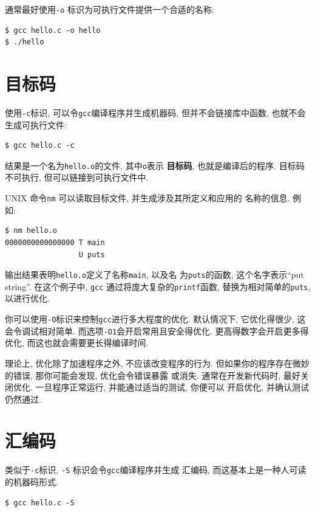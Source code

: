 \documentclass[12pt]{book}
\begin{document}
{通常最好使用{\tt -o} 标识为可执行文件提供一个合适的名称:

\begin{verbatim}
$ gcc hello.c -o hello
$ ./hello
\end{verbatim}


\section{目标码}

使用{\tt -c}标识, 可以令{\tt gcc}编译程序并生成机器码, 但并不会链接库中函数, 也就不会生成可执行文件:

\begin{verbatim}
$ gcc hello.c -c
\end{verbatim}

结果是一个名为{\tt hello.o}的文件, 其中{\tt o}表示
{\bf 目标码}, 也就是编译后的程序. 
目标码不可执行, 但可以链接到可执行文件中.

UNIX 命令{\tt nm} 可以读取目标文件, 并生成涉及其所定义和应用的
名称的信息. 例如:

\begin{verbatim}
$ nm hello.o
0000000000000000 T main
                 U puts
\end{verbatim}

输出结果表明{\tt hello.o}定义了名称{\tt main}, 以及名
为{\tt puts}的函数, 这个名字表示``put string''.
在这个例子中, {\tt gcc} 通过将庞大复杂的{\tt printf}函数,
替换为相对简单的{\tt puts}, 以进行优化.

你可以使用{\tt -O}标识来控制{\tt gcc}进行多大程度的优化.
默认情况下, 它优化得很少, 这会令调试相对简单.
而选项{\tt -O1}会开启常用且安全得优化.
更高得数字会开启更多得优化, 而这也就会需要更长得编译时间.

理论上, 优化除了加速程序之外, 不应该改变程序的行为. 
但如果你的程序存在微妙的错误, 那你可能会发现, 优化会令错误暴露
或消失. 通常在开发新代码时, 最好关闭优化.
一旦程序正常运行, 并能通过适当的测试, 你便可以
开启优化, 并确认测试仍然通过.


\section{汇编码}

类似于{\tt -c}标识, {\tt -S} 标识会令{\tt gcc}编译程序并生成
汇编码, 而这基本上是一种人可读的机器码形式.

\begin{verbatim}
$ gcc hello.c -S
\end{verbatim}

}
\end{document}
